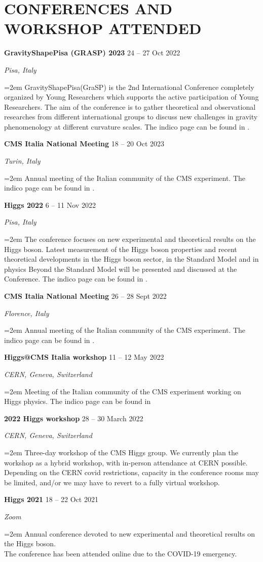 \documentclass[fontsize=12pt]{article} %
\newcommand{\sepspacesmall}{\vspace*{0.3em}}
\newcommand{\NewPart}[1]{\section*{\uppercase{#1}}}
\newcommand{\EducationEntry}[4]{
	\noindent \textbf{#1} \hfill      %
	{#2} \par  %
	\noindent \textit{#3} \par        %
	\noindent\hangindent=2em\hangafter=0 \small #4 %
	\normalsize \par}
\begin{document}
	\NewPart{Conferences and Workshop attended}
	\EducationEntry{GravityShapePisa (GRASP) 2023}{24 {--} 27 Oct 2022}{Pisa, Italy}{GravityShapePisa(GraSP) is the 2nd International Conference completely organized by Young Researchers which supports the active participation of Young Researchers. The aim of the conference is to gather theoretical and observational researches from different international groups to discuss new challenges in gravity phenomenology at different curvature scales. The indico page can be found in \cite{grasp}.}
	\sepspacesmall
	\EducationEntry{CMS Italia National Meeting}{18 {--} 20 Oct 2023}{Turin, Italy}{Annual meeting of the Italian community of the CMS experiment. The indico page can be found in \cite{cmsItalia2023}.}
	\sepspacesmall
	\EducationEntry{Higgs 2022}{6 {--} 11 Nov 2022}{Pisa, Italy}{The conference focuses on new experimental and theoretical results on the Higgs boson. Latest measurement of the Higgs boson properties and recent theoretical developments in the  Higgs boson sector, in the Standard Model and in physics Beyond the Standard Model will be presented and discussed at the Conference. The indico page can be found in \cite{Higgs22}.}
	\sepspacesmall
	\EducationEntry{CMS Italia National Meeting}{26 {--} 28 Sept 2022}{Florence, Italy}{Annual meeting of the Italian community of the CMS experiment. The indico page can be found in \cite{cmsItalia2022}.}
	\sepspacesmall
	\EducationEntry{Higgs@CMS Italia workshop}{11 {--} 12 May 2022}{CERN, Geneva, Switzerland}{Meeting of the Italian community of the CMS experiment working on Higgs physics. The indico page can be found in \cite{HigCMSItalia}}
	\sepspacesmall
	\EducationEntry{2022 Higgs workshop}{28 {--} 30 March 2022}{CERN, Geneva, Switzerland}{Three-day workshop of the CMS Higgs group. We currently plan the workshop as a hybrid workshop, with in-person attendance at CERN possible. Depending on the CERN covid restrictions, capacity in the conference rooms may be limited, and/or we may have to revert to a fully virtual workshop. \cite{2022HiggsWorkshop}}
	\EducationEntry{Higgs 2021}{18 {--} 22 Oct 2021}{Zoom}{Annual conference devoted to new experimental and theoretical results on the Higgs boson. \\The conference has been attended online due to the COVID-19 emergency. \cite{Higgs_2021}} %
\end{document}
